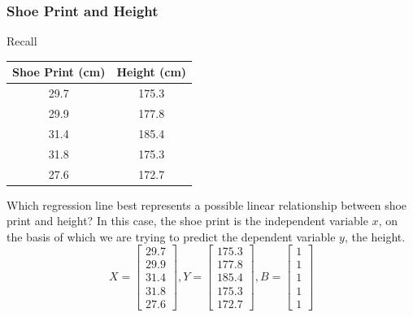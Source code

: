 \documentclass[xcolor=dvipsnames]{beamer}
\begin{document}
\begin{frame}
  \frametitle{Shoe Print and Height}
   Recall

    \begin{tabular}{|c|c|}\hline
    Shoe Print (cm) & Height (cm) \\ \hline
    29.7 & 175.3 \\ \hline
    29.9 & 177.8 \\ \hline
    31.4 & 185.4 \\ \hline
    31.8 & 175.3 \\ \hline
    27.6 & 172.7 \\ \hline
  \end{tabular}

  Which \alert{regression line} best represents a possible linear
  relationship between shoe print and height? In this case, the shoe
  print is the independent variable $x$, on the basis of which we are
  trying to predict the dependent variable $y$, the height.
  \begin{equation}
    \label{eq:ohngahse}
    X=\left[
      \begin{array}{c}
    29.7 \\
    29.9 \\
    31.4 \\
    31.8 \\
    27.6
      \end{array}\right],Y=\left[
      \begin{array}{c}
    175.3 \\
    177.8 \\
    185.4 \\
    175.3 \\
    172.7 
      \end{array}\right],B=\left[
      \begin{array}{c}
    1 \\
    1 \\
    1 \\
    1 \\
    1 
      \end{array}\right]
  \end{equation}
\end{frame}
\end{document}
